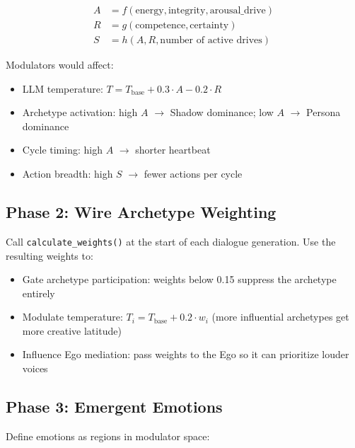 \documentclass[11pt,oneside]{article}
\begin{document}
\begin{align}
A &= f(\text{energy}, \text{integrity}, \text{arousal\_drive}) \\
R &= g(\text{competence}, \text{certainty}) \\
S &= h(A, R, \text{number of active drives})
\end{align}

Modulators would affect:
\begin{itemize}
  \item LLM temperature: $T = T_{\text{base}} + 0.3 \cdot A - 0.2 \cdot R$
  \item Archetype activation: high $A$ $\to$ Shadow dominance; low $A$ $\to$ Persona dominance
  \item Cycle timing: high $A$ $\to$ shorter heartbeat
  \item Action breadth: high $S$ $\to$ fewer actions per cycle
\end{itemize}

\subsection{Phase 2: Wire Archetype Weighting}

Call \texttt{calculate\_weights()} at the start of each dialogue generation.
Use the resulting weights to:
\begin{itemize}
  \item Gate archetype participation: weights below 0.15 suppress the archetype entirely
  \item Modulate temperature: $T_i = T_{\text{base}} + 0.2 \cdot w_i$ (more influential archetypes get more creative latitude)
  \item Influence Ego mediation: pass weights to the Ego so it can prioritize louder voices
\end{itemize}

\subsection{Phase 3: Emergent Emotions}

Define emotions as regions in modulator space:
\end{document}
